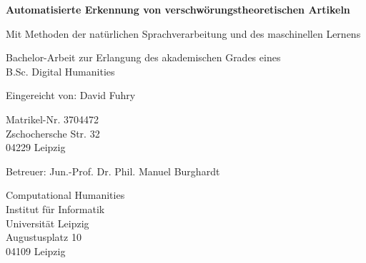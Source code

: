 \documentclass[a4paper, monochrome]{article}
\begin{document}
\begin{titlepage}
    \begin{center}
        \vspace*{1cm}

        \textbf{\Large Automatisierte Erkennung von verschwörungstheoretischen Artikeln}

        \vspace{0.5cm}
        Mit Methoden der natürlichen Sprachverarbeitung und des maschinellen Lernens
                
        \vspace{1.5cm}


        \vfill
                
        Bachelor-Arbeit zur Erlangung des akademischen Grades eines\\
        B.Sc. Digital Humanities

        \vspace{3cm}
                
        Eingereicht von: David Fuhry
        
        \vspace{0.2cm}

        Matrikel-Nr. 3704472\\
        Zschochersche Str. 32\\
        04229 Leipzig

        \vspace{1cm}

        Betreuer: Jun.-Prof. Dr. Phil. Manuel Burghardt
        
        \vspace{0.2cm}
                    
        Computational Humanities\\
        Institut für Informatik\\
        Universität Leipzig\\
        Augustusplatz 10\\
        04109 Leipzig 
                
    \end{center}
\end{titlepage}

\tableofcontents

\thispagestyle{empty}

\newpage




\end{document}
